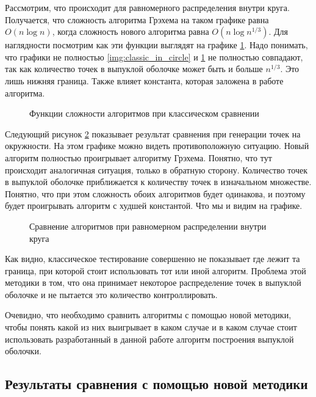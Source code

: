 Рассмотрим, что происходит для равномерного распределения внутри круга. Получается, что сложность алгоритма Грэхема на таком графике равна $O(n \log{n})$, когда сложность нового алгоритма равна $O(n \log{n^{1/3}})$. Для наглядности посмотрим как эти функции выглядят на графике \ref{img:charts_comparison}. Надо понимать, что графики не полностью \ref{img:classic_in_circle} и \ref{img:charts_comparison} не полностью совпадают, так как количество точек в выпуклой оболочке может быть и больше $n^{1/3}$. Это лишь нижняя граница. Также влияет константа, которая заложена в работе алгоритма.

\begin{figure}
	\centering
	
	\caption{Функции сложности алгоритмов при классическом сравнении}
	\label{img:charts_comparison}
\end{figure}

Следующий рисунок \ref{img:classic_on_circle} показывает результат сравнения при генерации точек на окружности. На этом графике можно видеть противоположную ситуацию. Новый алгоритм полностью проигрывает алгоритму Грэхема. Понятно, что тут происходит аналогичная ситуация, только в обратную сторону. Количество точек в выпуклой оболочке приближается к количеству точек в изначальном множестве. Понятно, что при этом сложность обоих алгоритмов будет одинакова, и поэтому будет проигрывать алгоритм с худшей константой. Что мы и видим на графике.

\begin{figure}
	\centering
	
	\caption{Сравнение алгоритмов при равномерном распределении внутри круга}
	\label{img:classic_on_circle}
\end{figure}

Как видно, классическое тестирование совершенно не показывает где лежит та граница, при которой стоит использовать тот или иной алгоритм. Проблема этой методики в том, что она принимает некоторое распределение точек в выпуклой оболочке и не пытается это количество контроллировать.

Очевидно, что необходимо сравнить алгоритмы с помощью новой методики, чтобы понять какой из них выигрывает в каком случае и в каком случае стоит использовать разработанный в данной работе алгоритм построения выпуклой оболочки.

\subsection{Результаты сравнения с помощью новой методики}

